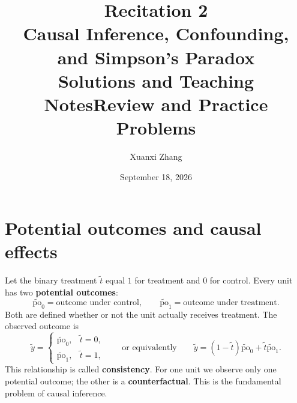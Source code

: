 \documentclass[11pt]{article}
\title{\huge Recitation 2\\[0.35em]
  \normalsize Causal Inference, Confounding, and Simpson's Paradox\\[0.35em]
  \large\ifsolutions Solutions and Teaching Notes\else Review and Practice Problems\fi}
\author{Xuanxi Zhang}
\date{September 18, 2026}
\newif\ifsolutions
\newcommand{\rv}[1]{\widetilde{#1}}
\newcommand{\po}[1]{\widetilde{\mathrm{po}}_{#1}}
\begin{document}
\maketitle

\ifsolutions
\section*{Pacing guide (75 minutes)}
\begin{center}
\begin{tabular}{@{}lll@{}}
\toprule
Time & Activity & Suggested use \\
\midrule
0--25 min & Review & Potential outcomes, confounding, Curry--Lee example \\
25--38 min & Problem 1 & 7 min individual work, then discussion \\
38--53 min & Problem 2 & 8 min individual work, then discussion \\
53--68 min & Problem 3 & 8 min individual work, then discussion \\
68--75 min & Wrap-up or Problem 4 & Use Problem 4 only if the class is ahead \\
\bottomrule
\end{tabular}
\end{center}

\paragraph{Teaching emphasis.}
Keep three quantities distinct: an observed conditional probability, a
potential-outcome probability, and a standardized probability. In the
basketball example, emphasize that standardization is a better descriptive
comparison but is causal only under the stated conditional-independence
assumption.
\fi

\section{Potential outcomes and causal effects}

Let the binary treatment $\rv{t}$ equal $1$ for treatment and $0$ for control.
Every unit has two \textbf{potential outcomes}:
\[
  \po{0}=\text{outcome under control},
  \qquad
  \po{1}=\text{outcome under treatment}.
\]
Both are defined whether or not the unit actually receives treatment. The
observed outcome is
\[
  \rv{y}=
  \begin{cases}
    \po{0}, & \rv{t}=0,\\
    \po{1}, & \rv{t}=1,
  \end{cases}
  \qquad\text{or equivalently}\qquad
  \rv{y}=(1-\rv{t})\po{0}+\rv{t}\po{1}.
\]
This relationship is called \textbf{consistency}. For one unit we observe only
one potential outcome; the other is a \textbf{counterfactual}. This is the
fundamental problem of causal inference.
\end{document}
